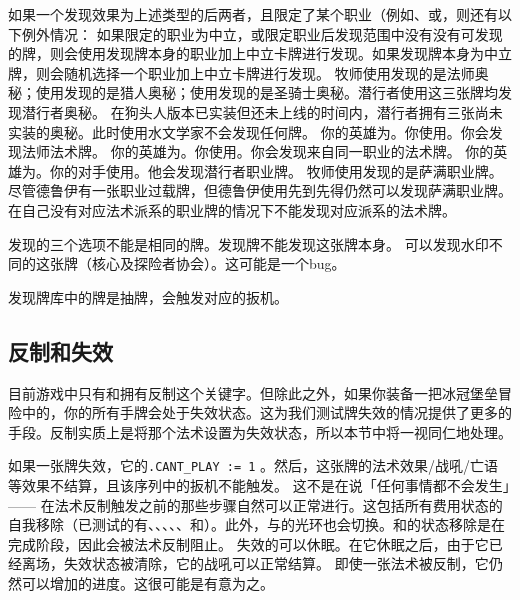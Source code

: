 如果一个发现效果为上述类型的后两者，且限定了某个职业（例如、或，则还有以下例外情况：
\notice 如果限定的职业为中立，或限定职业后发现范围中没有没有可发现的牌，则会使用发现牌本身的职业加上中立卡牌进行发现。如果发现牌本身为中立牌，则会随机选择一个职业加上中立卡牌进行发现。
\example 牧师使用发现的是法师奥秘；使用发现的是猎人奥秘；使用发现的是圣骑士奥秘。潜行者使用这三张牌均发现潜行者奥秘。
\history {} 在狗头人版本已实装但还未上线的时间内，潜行者拥有三张尚未实装的奥秘。此时使用水文学家不会发现任何牌。
\example 你的英雄为。你使用。你会发现法师法术牌。
\example 你的英雄为。你使用。你会发现来自同一职业的法术牌。
\example 你的英雄为。你的对手使用。他会发现潜行者职业牌。
\example 牧师使用发现的是萨满职业牌。
\exception 尽管德鲁伊有一张职业过载牌，但德鲁伊使用先到先得仍然可以发现萨满职业牌。
\exception {}在自己没有对应法术派系的职业牌的情况下不能发现对应派系的法术牌。

发现的三个选项不能是相同的牌。发现牌不能发现这张牌本身。
\notice {}可以发现水印不同的这张牌（核心及探险者协会）。这可能是一个bug。

发现牌库中的牌是抽牌，会触发对应的扳机。

\subsection{反制和失效}
\label{counter}

目前游戏中只有和拥有反制这个关键字。但除此之外，如果你装备一把冰冠堡垒冒险中的，你的所有手牌会处于失效状态。这为我们测试牌失效的情况提供了更多的手段。反制实质上是将那个法术设置为失效状态，所以本节中将一视同仁地处理。

如果一张牌失效，它的\texttt{.CANT\_PLAY := 1} 。然后，这张牌的法术效果/战吼/亡语等效果不结算，且该序列中的扳机不能触发。
\notice 这不是在说「任何事情都不会发生」—— 在法术反制触发之前的那些步骤自然可以正常进行。这包括所有费用状态的自我移除（已测试的有、、、、、和）。此外，与的光环也会切换。和的状态移除是在完成阶段，因此会被法术反制阻止。
\exception {}失效的可以休眠。在它休眠之后，由于它已经离场，失效状态被清除，它的战吼可以正常结算。
\exception {} 即使一张法术被反制，它仍然可以增加的进度。这很可能是有意为之。

